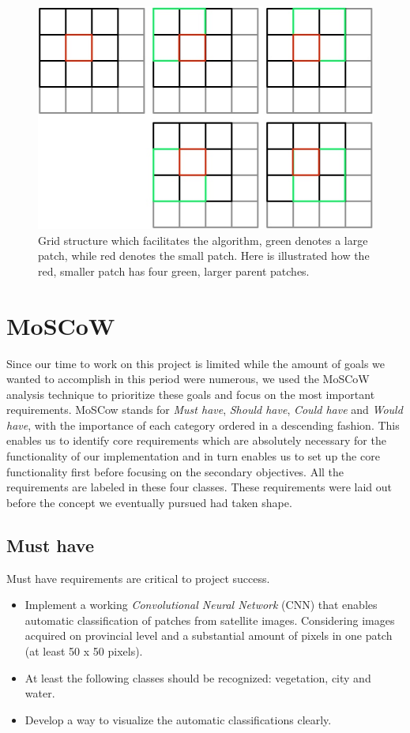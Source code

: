 \documentclass[a4paper,onecolumn]{report}
\begin{document}
\begin{figure}[h!]
    \centering
    \includegraphics[scale=0.6]{./images/grid_explained.jpg}
    \caption{Grid structure which facilitates the algorithm, green denotes a large patch, while red denotes the small patch. Here is illustrated how the red, smaller patch has four green, larger parent patches.}
	\label{fig:grid}
\end{figure}

\section{MoSCoW}
\label{sec:MoSCoW requirements}
Since our time to work on this project is limited while the amount of goals we wanted to accomplish in this period were numerous, we used the MoSCoW analysis technique to prioritize these goals and focus on the most important requirements. MoSCow stands for \textit{Must have}, \textit{Should have}, \textit{Could have} and \textit{Would have}, with the importance of each category ordered in a descending fashion. This enables us to identify core requirements which are absolutely necessary for the functionality of our implementation and in turn enables us to set up the core functionality first before focusing on the secondary objectives. All the requirements are labeled in these four classes. These requirements were laid out before the concept we eventually pursued had taken shape.\\

\subsection{Must have}
Must have requirements are critical to project success. 
\begin{itemize}
\item Implement a working \textit{Convolutional Neural Network} (CNN) that enables automatic classification of patches from satellite images. Considering images acquired on provincial level and a substantial amount of pixels in one patch (at least 50 x 50 pixels). 
\item At least the following classes should be recognized: vegetation, city and water. 
\item Develop a way to visualize the automatic classifications clearly.
\end{itemize}
\end{document}

